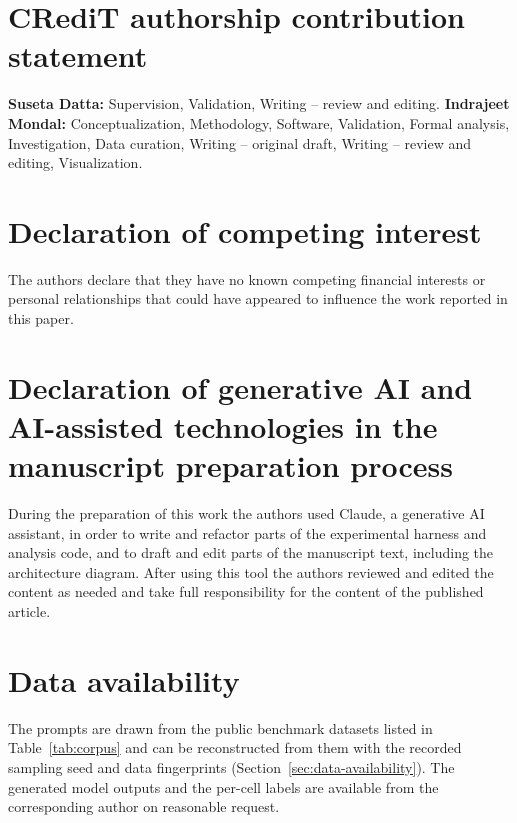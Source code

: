 
\section*{CRediT authorship contribution statement}

\textbf{Suseta Datta:} Supervision, Validation, Writing -- review and
editing.
\textbf{Indrajeet Mondal:} Conceptualization, Methodology, Software,
Validation, Formal analysis, Investigation, Data curation, Writing --
original draft, Writing -- review and editing, Visualization.

\section*{Declaration of competing interest}

The authors declare that they have no known competing financial interests or
personal relationships that could have appeared to influence the work
reported in this paper.

\section*{Declaration of generative AI and AI-assisted technologies in the
manuscript preparation process}

During the preparation of this work the authors used Claude, a generative AI
assistant, in order to write and refactor parts of the experimental harness
and analysis code, and to draft and edit parts of the manuscript text,
including the architecture diagram. After using this tool the authors
reviewed and edited the content as needed and take full responsibility for
the content of the published article.

\section*{Data availability}

The prompts are drawn from the public benchmark datasets listed in
Table~\ref{tab:corpus} and can be reconstructed from them with the recorded
sampling seed and data fingerprints (Section~\ref{sec:data-availability}).
The generated model outputs and the per-cell labels are available from the
corresponding author on reasonable request.

